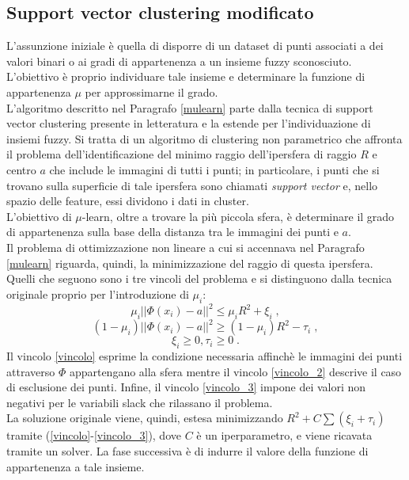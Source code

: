 \documentclass[12pt]{report}
\theoremstyle{definition}
\begin{document}
\subsection{Support vector clustering modificato}
L'assunzione iniziale è quella di disporre di un dataset di punti associati a dei valori binari o ai gradi di appartenenza a un insieme fuzzy sconosciuto.
L'obiettivo è proprio individuare tale insieme e determinare la funzione di appartenenza $\mu$ per approssimarne il grado.
\\
L'algoritmo descritto nel Paragrafo \ref{mulearn} parte dalla tecnica di support vector clustering presente in letteratura \cite{23} e la estende per l'individuazione di insiemi fuzzy. Si tratta di un algoritmo di clustering non parametrico che affronta il problema dell'identificazione del minimo raggio dell'ipersfera di raggio $R$ e centro $a$ che include le immagini di tutti i punti; in particolare, i punti che si trovano sulla superficie di tale ipersfera sono chiamati \textit{support vector} e, nello spazio delle feature, essi dividono i dati in cluster.
\\
L'obiettivo di $\mu$-learn, oltre a trovare la più piccola sfera, è determinare il grado di appartenenza sulla base della distanza tra le immagini dei punti e $a$.
\\
Il problema di ottimizzazione non lineare a cui si accennava nel Paragrafo \ref{mulearn} riguarda, quindi, la minimizzazione del raggio di questa ipersfera.
\\
Quelli che seguono sono i tre vincoli del problema e si distinguono dalla tecnica originale proprio per l'introduzione di $\mu_i$:
\\
\begin{equation}\label{vincolo}
    \mu_i || \mathit{\Phi}(x_i) - a ||^2 \leq \mu_iR^2 + \xi_i \;,
\end{equation}
\begin{equation}\label{vincolo_2}
    (1 - \mu_i) || \mathit{\Phi}(x_i) - a ||^2 \geq (1 - \mu_i)R^2 - \tau_i \;,
\end{equation}
\begin{equation}\label{vincolo_3}
    \xi_i \geq 0, \tau_i \geq 0 \;.
\end{equation}
Il vincolo \ref{vincolo} esprime la condizione necessaria affinchè le immagini dei punti attraverso $\mathit{\Phi}$ appartengano alla sfera mentre il vincolo \ref{vincolo_2} descrive il caso di esclusione dei punti. Infine, il vincolo \ref{vincolo_3} impone dei valori non negativi per le variabili slack che rilassano il problema.
\\
La soluzione originale viene, quindi, estesa minimizzando $R^2 + C\sum(\xi_i + \tau_i)$ tramite (\ref{vincolo}-\ref{vincolo_3}), dove $C$ è un iperparametro, e viene ricavata tramite un solver.
La fase successiva è di indurre il valore della funzione di appartenenza a tale insieme.
\end{document}
